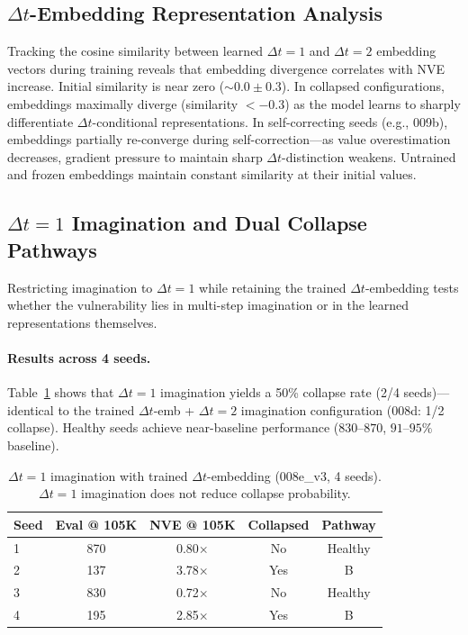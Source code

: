 \documentclass[10pt,letterpaper]{article}
\newcommand{\dt}{\Delta t}
\begin{document}
\subsection{$\dt$-Embedding Representation Analysis}
\label{sec:cosine}

Tracking the cosine similarity between learned $\dt{=}1$ and $\dt{=}2$ embedding vectors during training reveals that embedding divergence correlates with NVE increase.
Initial similarity is near zero (${\sim}0.0 \pm 0.3$).
In collapsed configurations, embeddings maximally diverge (similarity $< -0.3$) as the model learns to sharply differentiate $\dt$-conditional representations.
In self-correcting seeds (e.g., 009b), embeddings partially re-converge during self-correction---as value overestimation decreases, gradient pressure to maintain sharp $\dt$-distinction weakens.
Untrained and frozen embeddings maintain constant similarity at their initial values.

\subsection{$\dt{=}1$ Imagination and Dual Collapse Pathways}
\label{sec:dt1_imag}

Restricting imagination to $\dt{=}1$ while retaining the trained $\dt$-embedding tests whether the vulnerability lies in multi-step imagination or in the learned representations themselves.

\paragraph{Results across 4 seeds.}
Table~\ref{tab:dt1_imag} shows that $\dt{=}1$ imagination yields a 50\% collapse rate (2/4 seeds)---identical to the trained $\dt$-emb + $\dt{=}2$ imagination configuration (008d: 1/2 collapse).
Healthy seeds achieve near-baseline performance ($830$--$870$, $91$--$95\%$ baseline).

\begin{table}[h]
\centering
\caption{$\dt{=}1$ imagination with trained $\dt$-embedding (008e\_v3, 4 seeds). $\dt{=}1$ imagination does not reduce collapse probability.}
\label{tab:dt1_imag}
\small
\begin{tabular}{lcccc}
\toprule
Seed & Eval @ 105K & NVE @ 105K & Collapsed & Pathway \\
\midrule
1 & 870 & 0.80$\times$ & No  & Healthy \\
2 & 137 & 3.78$\times$ & Yes & B \\
3 & 830 & 0.72$\times$ & No  & Healthy \\
4 & 195 & 2.85$\times$ & Yes & B \\
\bottomrule
\end{tabular}
\end{table}
\end{document}
